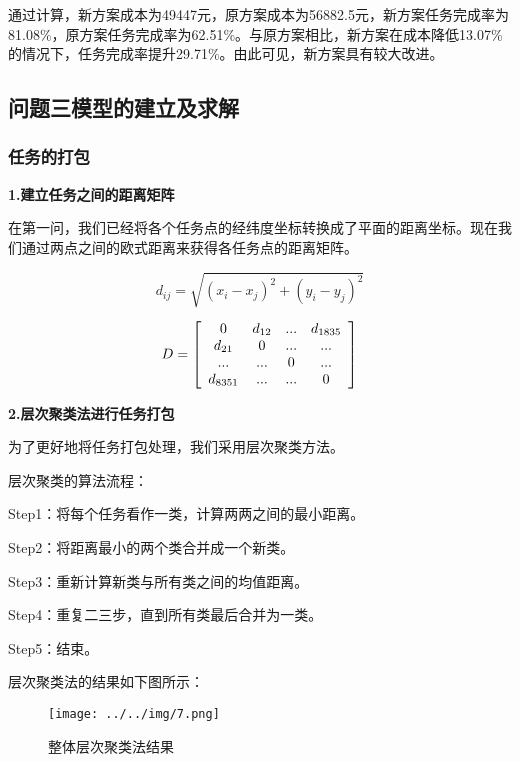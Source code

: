\documentclass[withoutpreface,bwprint]{cumcmthesis} %
\begin{document}
通过计算，新方案成本为49447元，原方案成本为56882.5元，新方案任务完成率为81.08\%，原方案任务完成率为62.51\%。与原方案相比，新方案在成本降低13.07\%的情况下，任务完成率提升29.71\%。由此可见，新方案具有较大改进。


\subsection{问题三模型的建立及求解}
\subsubsection{任务的打包}

\textbf{1.建立任务之间的距离矩阵}

在第一问，我们已经将各个任务点的经纬度坐标转换成了平面的距离坐标。现在我们通过两点之间的欧式距离来获得各任务点的距离矩阵。

\begin{equation}
{d_{ij}} = \sqrt {{{\left( {{x_i} - {x_j}} \right)}^2} + {{\left( {{y_i} - {y_j}} \right)}^2}}
\end{equation}

\begin{equation}
D = \left[ {\begin{array}{*{20}{c}}
	{\rm{0}}&{{d_{12}}}&{...}&{{d_{1835}}}\\
	{{d_{21}}}&{\rm{0}}&{...}&{...}\\
	{...}&{...}&{\rm{0}}&{...}\\
	{{d_{8351}}}&{...}&{...}&{\rm{0}}
	\end{array}} \right]
\end{equation}

\textbf{2.层次聚类法进行任务打包}

为了更好地将任务打包处理，我们采用层次聚类方法。

层次聚类的算法流程：

Step1：将每个任务看作一类，计算两两之间的最小距离。

Step2：将距离最小的两个类合并成一个新类。

Step3：重新计算新类与所有类之间的均值距离。

Step4：重复二三步，直到所有类最后合并为一类。

Step5：结束。

层次聚类法的结果如下图所示：

\begin{figure}[H]
	\small
	\centering
	\texttt{[image: ../../img/7.png]}
	\caption{整体层次聚类法结果} 
\end{figure}
\end{document}
